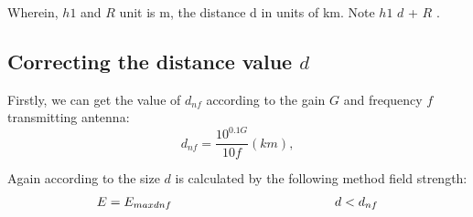 \documentclass[12pt,a4paper,twocolumn,fleqn]{narms}
\begin{document}
{Wherein, $h1$ and $R$ unit is m, the distance d in units of km. Note $h1$ $d$ + $R$ . 

\subsection{Correcting the distance value $d$}

Firstly, we can get the value of $d_{nf}$ according to the gain $G$ and frequency $f$ transmitting antenna:
\begin{equation}
{d_{nf}} = \frac{{{{10}^{0.1G}}}}{{10f}}(km), \label{keurough} \end{equation}

Again according to the size $d$ is calculated by the following method field strength:
\begin{equation}
\begin{array}{l}
E = {E_{maxdnf}}{\kern 1pt} {\kern 1pt} {\kern 1pt} {\kern 1pt} {\kern 1pt} {\kern 1pt} {\kern 1pt} {\kern 1pt} {\kern 1pt} {\kern 1pt} {\kern 1pt} {\kern 1pt} {\kern 1pt} {\kern 1pt} {\kern 1pt} {\kern 1pt} {\kern 1pt} {\kern 1pt} {\kern 1pt} {\kern 1pt} {\kern 1pt} {\kern 1pt} {\kern 1pt} {\kern 1pt} {\kern 1pt} {\kern 1pt} {\kern 1pt} {\kern 1pt} {\kern 1pt} {\kern 1pt} {\kern 1pt} {\kern 1pt} {\kern 1pt} {\kern 1pt} {\kern 1pt} {\kern 1pt} {\kern 1pt} {\kern 1pt} {\kern 1pt} {\kern 1pt} {\kern 1pt} {\kern 1pt} {\kern 1pt} {\kern 1pt} {\kern 1pt} {\kern 1pt} {\kern 1pt} {\kern 1pt} {\kern 1pt} {\kern 1pt} {\kern 1pt} {\kern 1pt} {\kern 1pt} {\kern 1pt} {\kern 1pt} {\kern 1pt} {\kern 1pt} {\kern 1pt} {\kern 1pt} {\kern 1pt} {\kern 1pt} {\kern 1pt} {\kern 1pt} {\kern 1pt} {\kern 1pt} {\kern 1pt} {\kern 1pt} {\kern 1pt} {\kern 1pt} {\kern 1pt} {\kern 1pt} {\kern 1pt} {\kern 1pt} {\kern 1pt} {\kern 1pt} {\kern 1pt} {\kern 1pt} {\kern 1pt} {\kern 1pt} {\kern 1pt} {\kern 1pt} {\kern 1pt} {\kern 1pt} {\kern 1pt} {\kern 1pt} {\kern 1pt} {\kern 1pt} {\kern 1pt} {\kern 1pt} {\kern 1pt} {\kern 1pt} {\kern 1pt} {\kern 1pt} {\kern 1pt} {\kern 1pt} {\kern 1pt} {\kern 1pt} {\kern 1pt} {\kern 1pt} {\kern 1pt} {\kern 1pt} {\kern 1pt} {\kern 1pt} {\kern 1pt} {\kern 1pt} {\kern 1pt} {\kern 1pt} {\kern 1pt} {\kern 1pt} {\kern 1pt} {\kern 1pt} {\kern 1pt} {\kern 1pt} {\kern 1pt} {\kern 1pt} {\kern 1pt} {\kern 1pt} {\kern 1pt} {\kern 1pt} {\kern 1pt} {\kern 1pt} {\kern 1pt} {\kern 1pt} {\kern 1pt} {\kern 1pt} {\kern 1pt} {\kern 1pt} {\kern 1pt} d < {d_{nf}}\\

\end{array}
\end{equation}}
\end{document}
